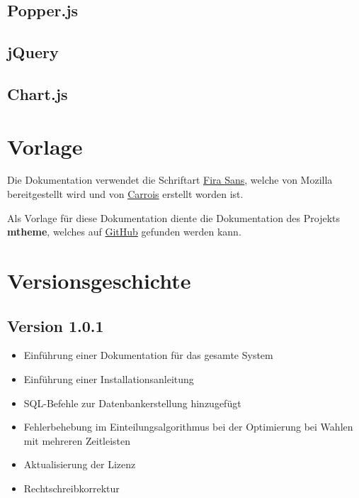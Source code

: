 \documentclass[ngerman]{ltxdoc}
\begin{document}


\subsection{Popper.js}



\subsection{jQuery}



\subsection{Chart.js}



\section{Vorlage}

Die Dokumentation verwendet die Schriftart
\href{https://www.mozilla.org/en-US/styleguide/products/firefox-os/typeface/}
{Fira Sans}, welche von Mozilla bereitgestellt wird und von
\href{http://www.carrois.com/fira-3-1/}{Carrois} erstellt worden ist.

Als Vorlage für diese Dokumentation diente die Dokumentation des Projekts \textbf{mtheme},
welches auf \href{https://github.com/matze/mtheme}{GitHub} gefunden werden kann.

\section{Versionsgeschichte}

\subsection*{Version 1.0.1}

\begin{itemize}
  \item Einführung einer Dokumentation für das gesamte System
  \item Einführung einer Installationsanleitung
  \item SQL-Befehle zur Datenbankerstellung hinzugefügt
  \item Fehlerbehebung im Einteilungsalgorithmus bei der Optimierung bei Wahlen
  mit mehreren Zeitleisten
  \item Aktualisierung der Lizenz
  \item Rechtschreibkorrektur
\end{itemize}
\end{document}
